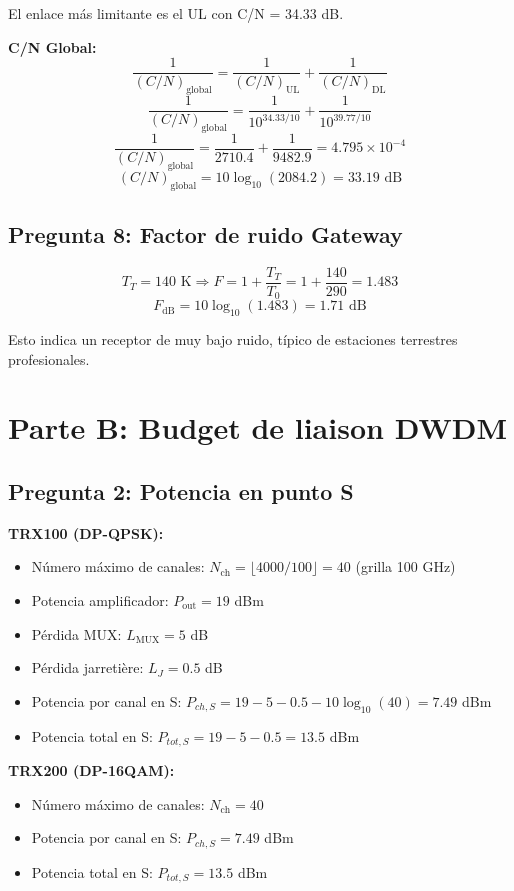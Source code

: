 \documentclass[a4paper,11pt]{article}
\begin{document}
El enlace más limitante es el UL con C/N = 34.33 dB.

\textbf{C/N Global:}
$$\frac{1}{(C/N)_{\text{global}}} = \frac{1}{(C/N)_{\text{UL}}} + \frac{1}{(C/N)_{\text{DL}}}$$
$$\frac{1}{(C/N)_{\text{global}}} = \frac{1}{10^{34.33/10}} + \frac{1}{10^{39.77/10}}$$
$$\frac{1}{(C/N)_{\text{global}}} = \frac{1}{2710.4} + \frac{1}{9482.9} = 4.795 \times 10^{-4}$$
$$(C/N)_{\text{global}} = 10\log_{10}(2084.2) = 33.19 \text{ dB}$$

\subsection*{Pregunta 8: Factor de ruido Gateway}

$$T_T = 140 \text{ K} \Rightarrow F = 1 + \frac{T_T}{T_0} = 1 + \frac{140}{290} = 1.483$$
$$F_{\text{dB}} = 10\log_{10}(1.483) = 1.71 \text{ dB}$$

Esto indica un receptor de muy bajo ruido, típico de estaciones terrestres profesionales.

\newpage
\section*{Parte B: Budget de liaison DWDM}

\subsection*{Pregunta 2: Potencia en punto S}

\textbf{TRX100 (DP-QPSK):}
\begin{itemize}
    \item Número máximo de canales: $N_{\text{ch}} = \lfloor 4000/100 \rfloor = 40$ (grilla 100 GHz)
    \item Potencia amplificador: $P_{\text{out}} = 19$ dBm
    \item Pérdida MUX: $L_{\text{MUX}} = 5$ dB
    \item Pérdida jarretière: $L_J = 0.5$ dB
    \item Potencia por canal en S: $P_{ch,S} = 19 - 5 - 0.5 - 10\log_{10}(40) = 7.49$ dBm
    \item Potencia total en S: $P_{tot,S} = 19 - 5 - 0.5 = 13.5$ dBm
\end{itemize}

\textbf{TRX200 (DP-16QAM):}
\begin{itemize}
    \item Número máximo de canales: $N_{\text{ch}} = 40$
    \item Potencia por canal en S: $P_{ch,S} = 7.49$ dBm
    \item Potencia total en S: $P_{tot,S} = 13.5$ dBm
\end{itemize}
\end{document}
